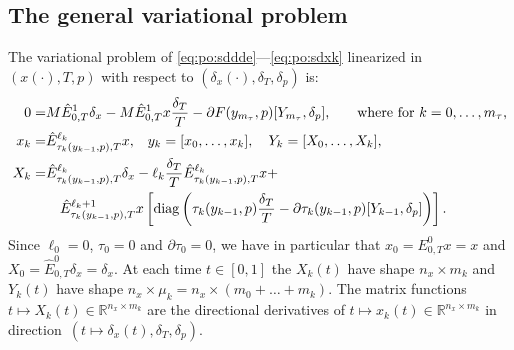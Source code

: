 \documentclass[11pt]{scrartcl}
\newcommand{\R}{\mathbb{R}}
\DeclareMathOperator{\diag}{diag}
\begin{document}
\subsection{The general variational problem}
\label{sec:vp}
The variational problem of \eqref{eq:po:sddde}---\eqref{eq:po:sdxk}
linearized in $(x(\cdot),T,p)$ with respect to
$(\delta_x(\cdot),\delta_T,\delta_p)$ is:
\begin{align}\allowdisplaybreaks
  0=&M\hat{E}^1_{0,T}\delta_x-M\hat{E}^1_{0,T}x\frac{\delta_T}{T}-\partial F(y_{m_\tau},p)[Y_{m_\tau},\delta_p]\label{eq:vp}
  \mbox{,\qquad where for $k=0,\ldots,m_\tau$,}\\
    x_k=&\hat{E}^{\ell_k}_{\tau_k(y_{k-1},p),T}x\mbox{,}\quad y_k=[x_0,\ldots,x_k],\quad Y_k=[X_0,\ldots,X_k]
  \mbox{,}\nonumber\\
  X_k=&\hat{E}^{\ell_k}_{\tau_k(y_{k-1},p),T}\delta_x-\ell_k\frac{\delta_T}{T}
  \hat{E}^{\ell_k}_{\tau_k(y_{k-1},p),T}x+\nonumber\\
  &\quad\hat{E}^{\ell_k+1}_{\tau_k(y_{k-1},p),T}x\left[\diag\left(\tau_k(y_{k-1},p)\frac{\delta_T}{T}-\partial\tau_k(y_{k-1},p)[Y_{k-1},\delta_p]\right)\right].\label{eq:vp:qk}
\end{align}
Since $\ell_0=0$, $\tau_0=0$ and $\partial\tau_0=0$, we have in
particular that $x_0=E^0_{0,T}x=x$ and
$X_0=\hat{E}^0_{0,T}\delta_x=\delta_x$. At each time $t\in[0,1]$ the
$X_k(t)$ have shape $n_x\times m_k$ and $Y_k(t)$ have shape
$n_x\times\mu_k=n_x\times(m_0+\ldots+m_k)$.  The matrix functions
$t\mapsto X_k(t)\in\R^{n_x\times m_k}$ are the directional derivatives
of $t\mapsto x_k(t)\in\R^{n_x\times m_k}$ in direction\
$(t\mapsto \delta_x(t),\delta_T,\delta_p)$.
\end{document}
